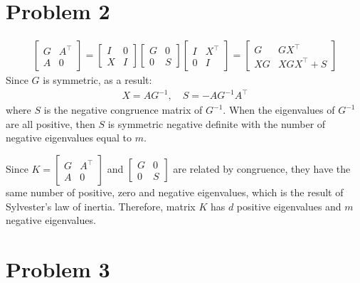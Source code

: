 \documentclass[12pt]{article}
\begin{document}
\section*{Problem 2}

\begin{align*}
    \left[\begin{array}{cc}
        G & A^\top \\
        A & 0
        \end{array}\right]=\left[\begin{array}{cc}
        I & 0 \\
        X & I
        \end{array}\right]\left[\begin{array}{cc}
        G & 0 \\
        0 & S
        \end{array}\right]\left[\begin{array}{cc}
        I & X^\top \\
        0 & I
    \end{array}\right]
    =
    \left[\begin{array}{cc}
        G & GX^\top \\
        XG & XGX^\top + S
    \end{array}\right]
\end{align*}
Since $G$ is symmetric, as a result:
\begin{align*}
    X = AG^{-1}, \quad S = -A G^{-1} A^\top
\end{align*}
where $S$ is the negative congruence matrix of $G^{-1}$. When the eigenvalues of $G^{-1}$ are all positive, then $S$ is symmetric negative definite with the number of negative eigenvalues equal to $m$.

Since $\displaystyle K=\left[\begin{array}{cc}
    G & A^\top \\
    A & 0
    \end{array}\right]$ and $\left[\begin{array}{cc}
        G & 0 \\
        0 & S
        \end{array}\right]$ are related by congruence, they have the same number of positive, zero and negative eigenvalues, which is the result of Sylvester's law of inertia. Therefore, matrix $K$ has $d$ positive eigenvalues and $m$ negative eigenvalues.

\section*{Problem 3}
\end{document}
